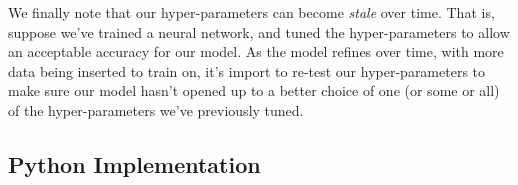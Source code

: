 We finally note that our hyper-parameters can become \textit{stale} over time.  That is, suppose we've trained a neural network, and tuned the hyper-parameters to allow an acceptable accuracy for our model.  As the model refines over time, with more data being inserted to train on, it's import to re-test our hyper-parameters to make sure our model hasn't opened up to a better choice of one (or some or all) of the hyper-parameters we've previously tuned.



\subsection{Python Implementation}

